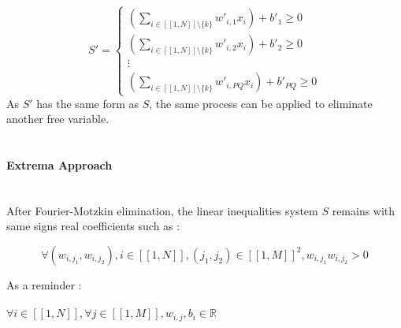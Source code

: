 \documentclass{article}
\begin{document}
\begin{appendices}
    \begin{equation*}
        S'=
        \begin{cases}
             (\sum_{i \in [\![1,N]\!] \setminus \lbrace{k}\rbrace} w'_{i,1}x_{i}) + b'_{1} \geqslant 0
            \\  (\sum_{i \in [\![1,N]\!] \setminus \lbrace{k}\rbrace} w'_{i,2}x_{i}) + b'_{2} \geqslant 0
            \\ \vdots 
            \\  (\sum_{i \in [\![1,N]\!] \setminus \lbrace{k}\rbrace} w'_{i,PQ}x_{i}) + b'_{PQ} \geqslant 0
        \end{cases}
        \end{equation*}
        As $S'$ has the same form as $S$, the same process can be applied to eliminate another free variable.\\\\
    
     
    \paragraph{Extrema Approach} \   
    \\
    After Fourier-Motzkin elimination, the linear inequalities system $S$ remains with same signs real coefficients such as :

    \begin{equation*}
        \forall (w_{i,j_1},w_{i,j_2}),i \in [\![1,N]\!],(j_1,j_2) \in [\![1,M]\!]^{2},w_{i,j_1}w_{i,j_2}>0 
    \end{equation*}


    As a reminder :\\\\
    $\forall i \in [\![1,N]\!],\forall j \in [\![1,M]\!],w_{i,j},b_{i} \in \mathbb{R}$


\end{appendices}
\end{document}
